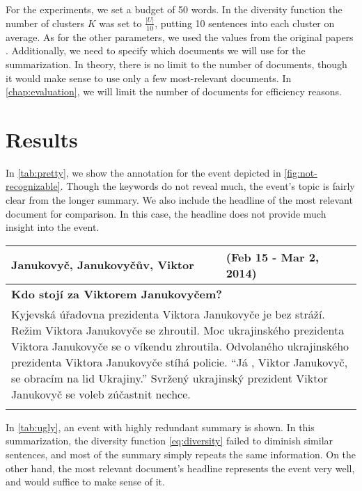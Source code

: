 For the experiments, we set a budget of 50 words. In the diversity function the number of clusters $K$ was set to $\frac{\left| U \right|}{10}$, putting 10 sentences into each cluster on average. As for the other parameters, we used the values from the original papers \citep{multi-summarization-1, multi-summarization-2}. Additionally, we need to specify which documents we will use for the summarization. In theory, there is no limit to the number of documents, though it would make sense to use only a few most-relevant documents. In \autoref{chap:evaluation}, we will limit the number of documents for efficiency reasons.

\section{Results}
In \autoref{tab:pretty}, we show the annotation for the event depicted in \autoref{fig:not-recognizable}. Though the keywords do not reveal much, the event's topic is fairly clear from the longer summary. We also include the headline of the most relevant document for comparison. In this case, the headline does not provide much insight into the event.

\hspace{\fill}

\begin{tabularx}{\linewidth}{l l} \toprule[1.5pt]
\bf Janukovyč, Janukovyčův, Viktor & \bf (Feb 15 - Mar 2, 2014) \\ \midrule
\multicolumn{2}{p{\linewidth}}{\bf Kdo stojí za Viktorem Janukovyčem?} \\
\multicolumn{2}{p{\linewidth}}{Kyjevská úřadovna prezidenta Viktora Janukovyče je bez stráží. Režim Viktora Janukovyče se zhroutil. Moc ukrajinského prezidenta Viktora Janukovyče se o víkendu zhroutila. Odvolaného ukrajinského prezidenta Viktora Janukovyče stíhá policie. ``Já , Viktor Janukovyč, se obracím na lid Ukrajiny.'' Svržený ukrajinský prezident Viktor Janukovyč se voleb zúčastnit nechce.} \\ \bottomrule[1.25pt]
\caption{Annotation for the event depicted in \autoref{fig:not-recognizable}} \label{tab:pretty}
\end{tabularx}

\hspace{\fill}

In \autoref{tab:ugly}, an event with highly redundant summary is shown. In this summarization, the diversity function \eqref{eq:diversity} failed to diminish similar sentences, and most of the summary simply repeats the same information. On the other hand, the most relevant document's headline represents the event very well, and would suffice to make sense of it.

